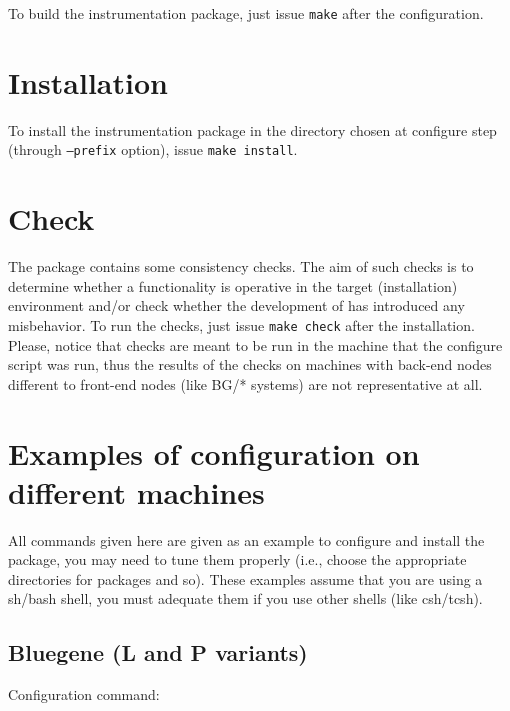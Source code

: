 To build the instrumentation package, just issue {\tt make} after the configuration.

\section{Installation}

To install the instrumentation package in the directory chosen at configure step (through {\tt --prefix} option), issue {\tt make install}.

\section{Check}

The \TRACE package contains some consistency checks. The aim of such checks is to determine whether a functionality is operative in the target (installation) environment and/or check whether the development of \TRACE has introduced any misbehavior. To run the checks, just issue {\tt make check} after the installation. Please, notice that checks are meant to be run in the machine that the configure script was run, thus the results of the checks on machines with back-end nodes different to front-end nodes (like BG/* systems) are not representative at all.

\section{Examples of configuration on different machines}

All commands given here are given as an example to configure and install the package, you may need to tune them properly (i.e., choose the appropriate directories for packages and so).  These examples assume that you are using a sh/bash shell, you must adequate them if you use other shells (like csh/tcsh).

\subsection{Bluegene (L and P variants)}

Configuration command:


